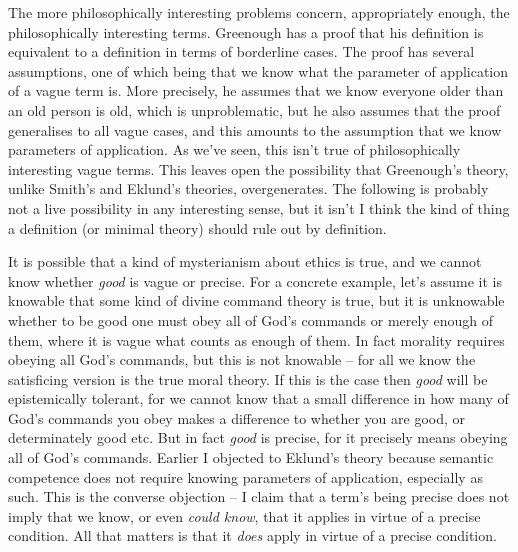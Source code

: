 \documentclass[
  11pt,
  letterpaper,
  DIV=11,
  numbers=noendperiod,
  twoside]{scrartcl}
\begin{document}
The more philosophically interesting problems concern, appropriately
enough, the philosophically interesting terms. Greenough has a proof
that his definition is equivalent to a definition in terms of borderline
cases. The proof has several assumptions, one of which being that we
know what the parameter of application of a vague term is. More
precisely, he assumes that we know everyone older than an old person is
old, which is unproblematic, but he also assumes that the proof
generalises to all vague cases, and this amounts to the assumption that
we know parameters of application. As we've seen, this isn't true of
philosophically interesting vague terms. This leaves open the
possibility that Greenough's theory, unlike Smith's and Eklund's
theories, overgenerates. The following is probably not a live
possibility in any interesting sense, but it isn't I think the kind of
thing a definition (or minimal theory) should rule out by definition.

It is possible that a kind of mysterianism about ethics is true, and we
cannot know whether \emph{good} is vague or precise. For a concrete
example, let's assume it is knowable that some kind of divine command
theory is true, but it is unknowable whether to be good one must obey
all of God's commands or merely enough of them, where it is vague what
counts as enough of them. In fact morality requires obeying all God's
commands, but this is not knowable -- for all we know the satisficing
version is the true moral theory. If this is the case then \emph{good}
will be epistemically tolerant, for we cannot know that a small
difference in how many of God's commands you obey makes a difference to
whether you are good, or determinately good etc. But in fact \emph{good}
is precise, for it precisely means obeying all of God's commands.
Earlier I objected to Eklund's theory because semantic competence does
not require knowing parameters of application, especially as such. This
is the converse objection -- I claim that a term's being precise does
not imply that we know, or even \emph{could know}, that it applies in
virtue of a precise condition. All that matters is that it \emph{does}
apply in virtue of a precise condition.
\end{document}
